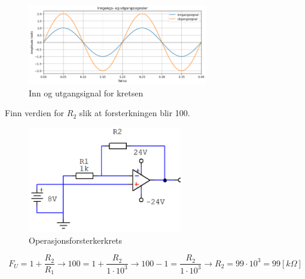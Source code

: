 \begin{solution}[name=Løsningsforslag oppgave]


\begin{figure}[H]
	\centering
	\includegraphics[width=0.7\textwidth]{operasjonsforsterker/plot/NONInvPlotSOL.png}
	\caption{Inn og utgangsignal for kretsen}
	\label{fig:NONinvPlotSol}
\end{figure}

\end{solution}
\vspace{0.5cm} %

\begin{question}[name=Oppgave, topic=operasjonsforsterker]
Finn verdien for $R_2$ slik at forsterkningen blir 100.
	\begin{figure}[H]
	\centering
	\includegraphics[width=0.6\textwidth]{operasjonsforsterker/figurer/NONinvBasic2.png}
	\caption{Operasjonsforsterkerkrets}
	\label{fig:NONinvKrets2}
\end{figure}

\end{question}

\vspace{0.5cm} %

\begin{solution}[name=Løsningsforslag oppgave]
\[F_U=1+\frac{R_2}{R_1} \rightarrow 100=1+\frac{R_2}{1 \cdot 10^3} \rightarrow 100-1=\frac{R_2}{1 \cdot 10^3} \rightarrow R_2=99 \cdot 10^3=99[k\Omega] \]

\end{solution}
\vspace{0.5cm} %

